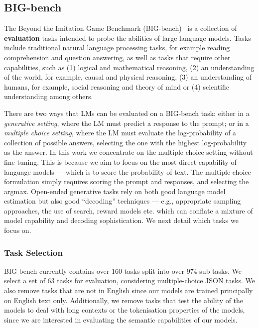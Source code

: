 \documentclass[11pt, a4paper, logo, internal, copyright, nonumbering]{deepmind}
\newcommand{\bigbench}{BIG-bench\xspace}
\begin{document}
\clearpage
\subsection{\bigbench}
\label{appendix:bigbench}
The Beyond the Imitation Game Benchmark (\bigbench)~\citep{bigbench} is a collection of \textbf{evaluation} tasks intended to probe the abilities of large language models. Tasks include traditional natural language processing tasks, for example reading comprehension and question answering, as well as tasks that require other capabilities, such as (1) logical and mathematical reasoning, (2) an understanding of the world, for example, causal and physical reasoning, (3) an understanding of humans, for example, social reasoning and theory of mind or (4) scientific understanding among others. 

There are two ways that LMs can be evaluated on a \bigbench task: either in a \textit{generative setting}, where the LM must predict a response to the prompt; or in a \textit{multiple choice setting}, where the LM must evaluate the log-probability of a collection of possible answers, selecting the one with the highest log-probability as the answer. In this work we concentrate on the multiple choice setting without fine-tuning. This is because we aim to focus on the most direct capability of language models --- which is to score the probability of text. The multiple-choice formulation simply requires scoring the prompt and responses, and selecting the argmax. Open-ended generative tasks rely on both good language model estimation but also good ``decoding'' techniques --- e.g., appropriate sampling approaches, the use of search, reward models etc. which can conflate a mixture of model capability and decoding sophistication. We next detail which tasks we focus on.

\subsubsection{Task Selection}
\label{sec:bb:select}
\bigbench currently contains over 160 tasks split into over 974 sub-tasks. We select a set of 63 tasks for evaluation, considering multiple-choice JSON tasks. 
We also remove tasks that are not in English since our models are trained principally on English text only. Additionally, we remove tasks that test the ability of the models to deal with long contexts or the tokenisation properties of the models, since we are interested in evaluating the semantic capabilities of our models.
\end{document}
